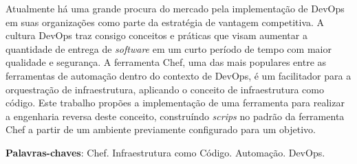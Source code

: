 \newpage
\begin{resumo}
  Atualmente há uma grande procura do mercado pela implementação de
  DevOps em suas organizações como parte da estratégia de vantagem
  competitiva. A cultura DevOps traz consigo conceitos e práticas
  que visam aumentar a quantidade de entrega de \textit{software} em um
  curto período de tempo com maior qualidade e segurança. A
  ferramenta Chef, uma das mais populares entre as ferramentas de
  automação dentro do contexto de DevOps, é um facilitador para
  a orquestração de infraestrutura, aplicando o conceito de
  infraestrutura como código. Este trabalho propões a implementação
  de uma ferramenta para realizar a engenharia reversa deste conceito,
  construíndo \textit{scrips} no padrão da ferramenta Chef a partir de um ambiente
  previamente configurado para um objetivo.

  \vspace{\onelineskip}
  \noindent
   \textbf{Palavras-chaves}: Chef. Infraestrutura como Código. Automação. DevOps.
\end{resumo}
